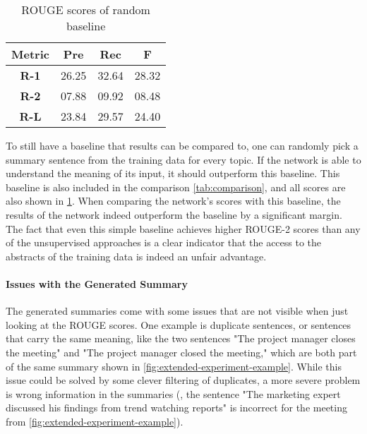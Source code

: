 \begin{table}[h]
\centering
\begin{tabular}{@{}clll@{}}
\toprule
\textbf{Metric} & \multicolumn{1}{c}{\textbf{Pre}} & \multicolumn{1}{c}{\textbf{Rec}} & \multicolumn{1}{c}{\textbf{F}} \\ \midrule
\textbf{R-1}    & 26.25                           & 32.64                           & 28.32                         \\
\textbf{R-2}    & 07.88                           & 09.92                           & 08.48                         \\
\textbf{R-L}    & 23.84                           & 29.57                           & 24.40                         \\ \bottomrule
\end{tabular}
\caption{ROUGE scores of random baseline}
\label{tab:extended-experiment-rouge-random}
\end{table}

To still have a baseline that results can be compared to, one can randomly pick a summary sentence from the training data for every topic.
If the network is able to understand the meaning of its input, it should outperform this baseline.
This baseline is also included in the comparison \cref{tab:comparison}, and all scores are also shown in \cref{tab:extended-experiment-rouge-random}.
When comparing the network's scores with this baseline, the results of the network indeed outperform the baseline by a significant margin.
The fact that even this simple baseline achieves higher ROUGE-2 scores than any of the unsupervised approaches is a clear indicator that the access to the abstracts of the training data is indeed an unfair advantage.

\paragraph{Issues with the Generated Summary}

The generated summaries come with some issues that are not visible when just looking at the ROUGE scores.
One example is duplicate sentences, or sentences that carry the same meaning, like the two sentences "The project manager closes the meeting" and "The project manager closed the meeting," which are both part of the same summary shown in \cref{fig:extended-experiment-example}.
While this issue could be solved by some clever filtering of duplicates, a more severe problem is wrong information in the summaries (\eg, the sentence "The marketing expert discussed his findings from trend watching reports" is incorrect for the meeting from \cref{fig:extended-experiment-example}).